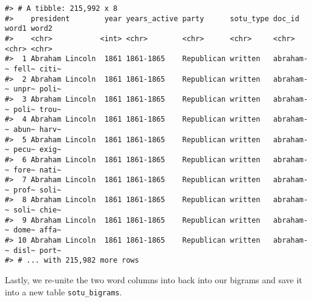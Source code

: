 \documentclass[
]{book}
\newenvironment{Shaded}{\begin{snugshade}}{\end{snugshade}}
\newcommand{\AttributeTok}[1]{\textcolor[rgb]{0.77,0.63,0.00}{#1}}
\newcommand{\CommentTok}[1]{\textcolor[rgb]{0.56,0.35,0.01}{\textit{#1}}}
\newcommand{\ConstantTok}[1]{\textcolor[rgb]{0.00,0.00,0.00}{#1}}
\newcommand{\DecValTok}[1]{\textcolor[rgb]{0.00,0.00,0.81}{#1}}
\newcommand{\FunctionTok}[1]{\textcolor[rgb]{0.00,0.00,0.00}{#1}}
\newcommand{\NormalTok}[1]{#1}
\newcommand{\OtherTok}[1]{\textcolor[rgb]{0.56,0.35,0.01}{#1}}
\newcommand{\SpecialCharTok}[1]{\textcolor[rgb]{0.00,0.00,0.00}{#1}}
\newcommand{\StringTok}[1]{\textcolor[rgb]{0.31,0.60,0.02}{#1}}
\begin{document}
\begin{verbatim}
#> # A tibble: 215,992 x 8
#>    president        year years_active party      sotu_type doc_id    word1 word2
#>    <chr>           <int> <chr>        <chr>      <chr>     <chr>     <chr> <chr>
#>  1 Abraham Lincoln  1861 1861-1865    Republican written   abraham-~ fell~ citi~
#>  2 Abraham Lincoln  1861 1861-1865    Republican written   abraham-~ unpr~ poli~
#>  3 Abraham Lincoln  1861 1861-1865    Republican written   abraham-~ poli~ trou~
#>  4 Abraham Lincoln  1861 1861-1865    Republican written   abraham-~ abun~ harv~
#>  5 Abraham Lincoln  1861 1861-1865    Republican written   abraham-~ pecu~ exig~
#>  6 Abraham Lincoln  1861 1861-1865    Republican written   abraham-~ fore~ nati~
#>  7 Abraham Lincoln  1861 1861-1865    Republican written   abraham-~ prof~ soli~
#>  8 Abraham Lincoln  1861 1861-1865    Republican written   abraham-~ soli~ chie~
#>  9 Abraham Lincoln  1861 1861-1865    Republican written   abraham-~ dome~ affa~
#> 10 Abraham Lincoln  1861 1861-1865    Republican written   abraham-~ disl~ port~
#> # ... with 215,982 more rows
\end{verbatim}

Lastly, we re-unite the two word columns into back into our bigrams and save it into a new table \texttt{sotu\_bigrams}.

\begin{Shaded}
\end{Shaded}
\end{document}
